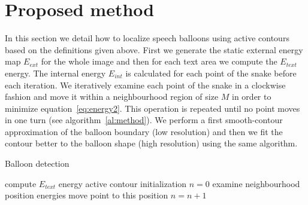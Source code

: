 \documentclass[conference]{IEEEtran}
\begin{document}
\section{Proposed method}
\label{sec:proposed_method}
In this section we detail how to localize speech balloons using active contours based on the definitions given above. 
First we generate the static external energy map $E_{ext}$ for the whole image and then for each text area we compute the $E_{text}$ energy. The internal energy $E_{int}$ is calculated for each point of the snake before each iteration. We iteratively examine each point of the snake in a clockwise fashion and move it within a neighbourhood region of size $M$ in order to minimize equation~\ref{eq:energy2}. This operation is repeated until no point moves in one turn (see algorithm~\ref{al:method}). We perform a first smooth-contour approximation of the balloon boundary (low resolution)
and then we fit the contour better to the balloon shape (high resolution) using the same algorithm.%
\begin{algorithm}
\caption{Balloon detection}
\label{al:method}
\begin{algorithmic}
  \State compute $E_{text}$ energy
  \State active contour initialization
  \Do
    \State $n = 0$
      \State examine neighbourhood position energies
	\State move point to this position
	\State $n=n+1$
      \EndIf
    \EndFor

\EndFor
\end{algorithmic}
\end{algorithm}
\end{document}
